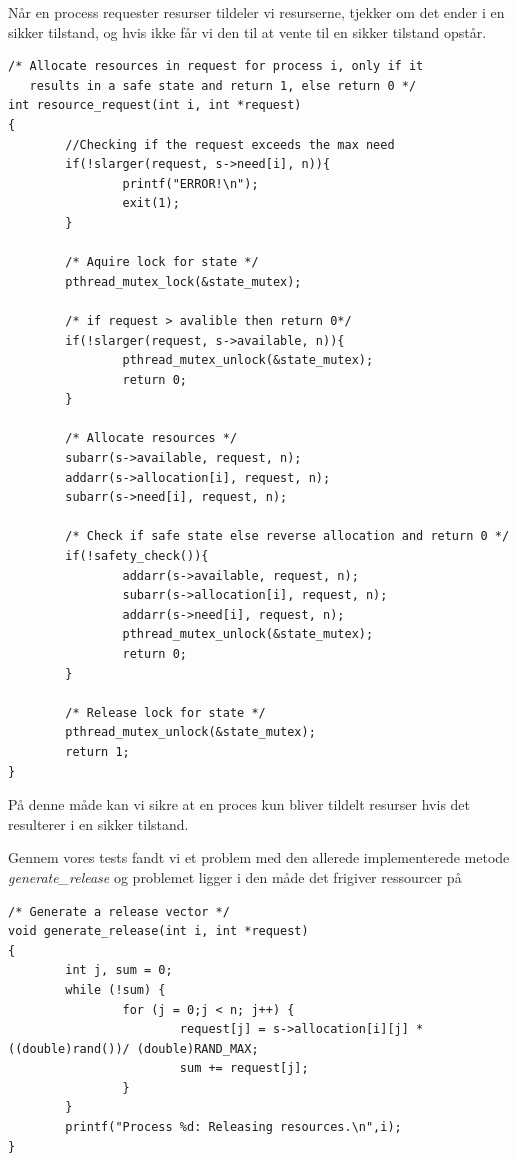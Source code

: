 \documentclass[danish]{report}
\begin{document}
Når en process requester resurser tildeler vi resurserne, tjekker om det ender i en sikker tilstand, og hvis ikke får vi den til at vente til en sikker tilstand opstår.

\begin{lstlisting}
/* Allocate resources in request for process i, only if it
   results in a safe state and return 1, else return 0 */
int resource_request(int i, int *request)
{
        //Checking if the request exceeds the max need
        if(!slarger(request, s->need[i], n)){
                printf("ERROR!\n");
                exit(1);
        }

        /* Aquire lock for state */
        pthread_mutex_lock(&state_mutex);

        /* if request > avalible then return 0*/
        if(!slarger(request, s->available, n)){
                pthread_mutex_unlock(&state_mutex);
                return 0;
        }

        /* Allocate resources */
        subarr(s->available, request, n);
        addarr(s->allocation[i], request, n);
        subarr(s->need[i], request, n);

        /* Check if safe state else reverse allocation and return 0 */
        if(!safety_check()){
                addarr(s->available, request, n);
                subarr(s->allocation[i], request, n);
                addarr(s->need[i], request, n);
                pthread_mutex_unlock(&state_mutex);
                return 0;
        }

        /* Release lock for state */
        pthread_mutex_unlock(&state_mutex);
        return 1;
}
\end{lstlisting}

På denne måde kan vi sikre at en proces kun bliver tildelt resurser hvis det resulterer i en sikker tilstand.

Gennem vores tests fandt vi et problem med den allerede implementerede metode \textit{generate\_release} og problemet ligger i den måde det frigiver ressourcer på

\begin{lstlisting}
/* Generate a release vector */
void generate_release(int i, int *request)
{
        int j, sum = 0;
        while (!sum) {
                for (j = 0;j < n; j++) {
                        request[j] = s->allocation[i][j] * ((double)rand())/ (double)RAND_MAX;
                        sum += request[j];
                }
        }
        printf("Process %d: Releasing resources.\n",i);
}
\end{lstlisting}
\end{document}
